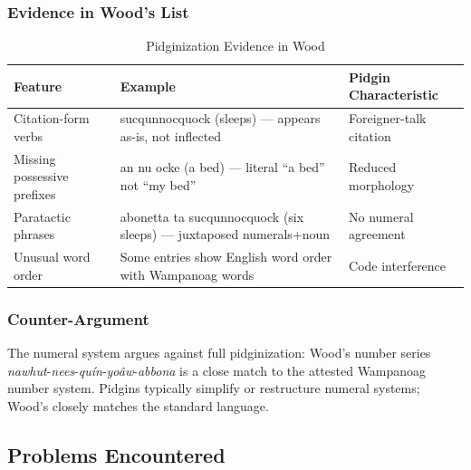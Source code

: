 \subsubsection{Evidence in Wood's List}

\begin{table}[htbp]
\centering
\caption{Pidginization Evidence in Wood}
\label{tab:1367-pidgin}
\begin{tabular}{lll}
\hline
Feature & Example & Pidgin Characteristic \\
\hline
Citation-form verbs & sucqunnocquock (sleeps) --- appears as-is, not inflected & Foreigner-talk citation \\
Missing possessive prefixes & an nu ocke (a bed) --- literal ``a bed'' not ``my bed'' & Reduced morphology \\
Paratactic phrases & abonetta ta sucqunnocquock (six sleeps) --- juxtaposed numerals+noun & No numeral agreement \\
Unusual word order & Some entries show English word order with Wampanoag words & Code interference \\
\hline
\end{tabular}
\end{table}

\subsubsection{Counter-Argument}

The numeral system argues against full pidginization: Wood's number series
\emph{nawhut}-\emph{nees}-\emph{quín}-\emph{yoâw}-\emph{abbona} is a close
match to the attested Wampanoag number system. Pidgins typically simplify or
restructure numeral systems; Wood's closely matches the standard language.

\subsection{Problems Encountered}

